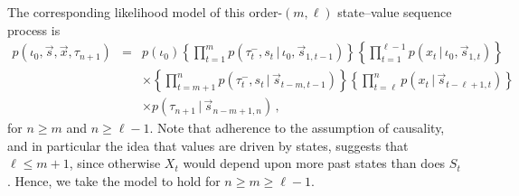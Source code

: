 \documentclass[a4paper]{article}
\newcommand{\tm}{\tau^{-}}
\newcommand{\vs}{\vec{s}}
\newcommand{\vx}{\vec{x}}
\begin{document}
The corresponding likelihood model of this order-$(m,\ell)$ state--value sequence process is
\begin{eqnarray}
p(\iota_0,\vs,\vx,\tau_{n+1}) & = &
p(\iota_0)
\left\{\prod_{t=1}^{m}p(\tm_t,s_t\,|\,\iota_0,\vs_{1,t-1})\right\}
\left\{\prod_{t=1}^{\ell-1}p(x_t\,|\,\iota_0,\vs_{1,t})\right\}
\nonumber\\&&
\times
\left\{\prod_{t=m+1}^{n}p(\tm_t,s_t\,|\,\vs_{t-m,t-1})\right\}
\left\{\prod_{t=\ell}^{n}p(x_t\,|\,\vs_{t-\ell+1,t})\right\}
\nonumber\\&&
\times
p(\tau_{n+1}\,|\,\vs_{n-m+1,n})\,,
\label{eq:mth-ellth-order}
\end{eqnarray}
for $n\ge m$ and $n\ge\ell-1$. Note that adherence to the assumption of causality, and in particular the idea that
values are driven by states, suggests that $\ell\le m+1$,
since otherwise $X_t$ would depend upon more past states than does $S_t$. Hence, we take the model to hold for
$n\ge m\ge\ell-1$.
\end{document}
